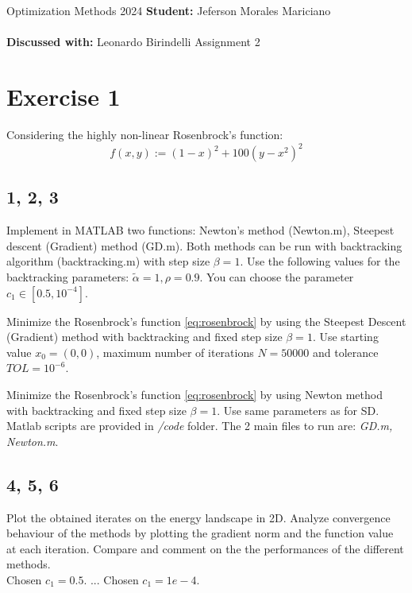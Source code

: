 \documentclass[unicode,11pt,a4paper,oneside,numbers=endperiod,openany]{scrartcl}
\begin{document}
\setassignment
{}

\serieheader
{Optimization Methods}
{2024}
{\textbf{Student:} Jeferson Morales Mariciano \\\\}
{\textbf{Discussed with:} Leonardo Birindelli}
{Assignment 2}{}
\newline



\section*{Exercise 1}
Considering the highly non-linear Rosenbrock's function:
\begin{equation} \label{eq:rosenbrock}
    f(x, y) := (1 - x)^2 + 100(y - x^2)^2 
\end{equation}

\subsection*{1, 2, 3}
Implement in MATLAB two functions: 
Newton's method (Newton.m), Steepest descent (Gradient) method (GD.m).
Both methods can be run with backtracking algorithm (backtracking.m) with step size $\beta = 1$. 
Use the following values for the backtracking parameters: 
$\tilde{\alpha} = 1, \rho = 0.9$. 
You can choose the parameter $c_1 \in [0.5, 10^{-4}]$.

Minimize the Rosenbrock's function \ref{eq:rosenbrock} 
by using the Steepest Descent (Gradient) method with backtracking and fixed step size $\beta = 1$. 
Use starting value $x_0 = (0, 0)$, 
maximum number of iterations $N = 50000$ and tolerance $TOL = 10^{-6}$.

Minimize the Rosenbrock's function \ref{eq:rosenbrock} 
by using Newton method with backtracking and fixed step size $\beta = 1$. 
Use same parameters as for SD.
\\\newline
Matlab scripts are provided in \textit{/code} folder.
The 2 main files to run are: \textit{GD.m, Newton.m}.

\subsection*{4, 5, 6}
Plot the obtained iterates on the energy landscape in 2D.
Analyze convergence behaviour of the methods by plotting the gradient norm and the function
value at each iteration.
Compare and comment on the the performances of the different methods.
\\\newline
Chosen $c_1 = 0.5$.
...
Chosen $c_1 = 1e-4$. 
\end{document}
